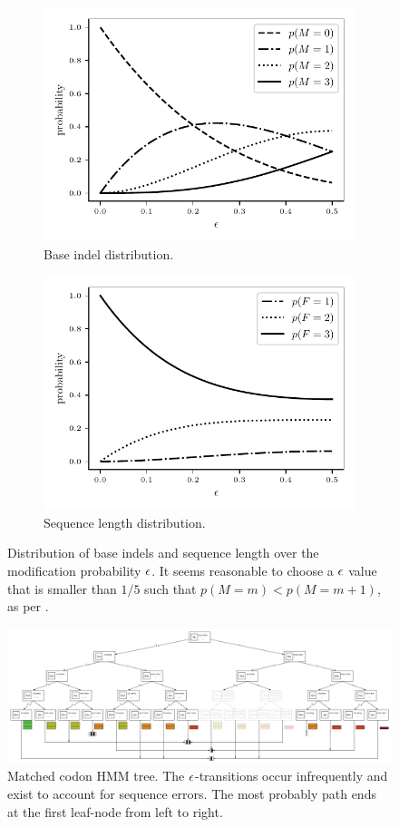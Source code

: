 \begin{figure}[htbp]
  \centering
  \captionsetup{width=0.85\linewidth}
  \begin{subfigure}{.5\linewidth}
    \centering
    \includegraphics[width=.7\linewidth]{figure/indel-prob}
    \caption{Base indel distribution.}\label{fig:indel-dist}
  \end{subfigure}%
  \begin{subfigure}{.5\linewidth}
    \centering
    \includegraphics[width=.7\linewidth]{figure/seq-len-prob}
    \caption{Sequence length distribution.}\label{fig:len-dist}
  \end{subfigure}
  \caption{ Distribution of base indels and sequence length over the modification probability
  $\epsilon$. It seems reasonable to choose a $\epsilon$ value that is smaller than $1/5$ such that
  $p(M=m)<p(M=m+1)$, as per . }\label{fig:dist}
\end{figure}

\newpage

\begin{figure}
    \centering
    \includegraphics[scale=0.9]{figure/codon-hmm-tree}
    \caption{Matched codon HMM tree.
        The $\epsilon$-transitions occur infrequently and exist to account for sequence errors.
        The most probably path ends at the first leaf-node from left to right.}\label{fig:codon-hmm-tree}
\end{figure}
